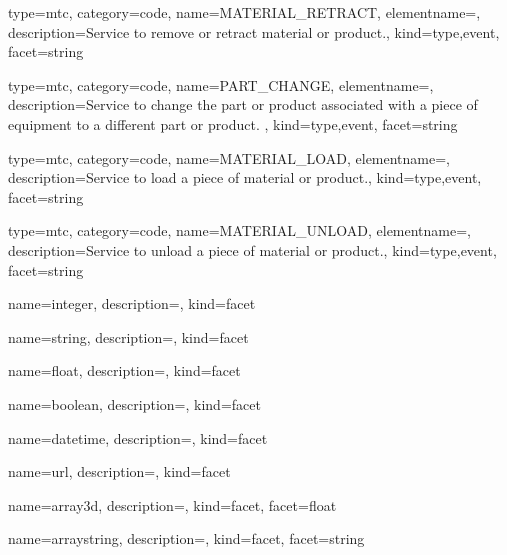 {
  type=mtc,
  category=code,
  name={MATERIAL\_RETRACT},
  elementname=,
  description={Service to remove or retract material or product.},
  kind={type,event},
  facet={\gls{string}}
}


{
  type=mtc,
  category=code,
  name={PART\_CHANGE},
  elementname=,
  description={Service to change the part or product associated with a piece of equipment to a different part or product.  },
  kind={type,event},
  facet={\gls{string}}
}


{
  type=mtc,
  category=code,
  name={MATERIAL\_LOAD},
  elementname=,
  description={Service to load a piece of material or product.},
  kind={type,event},
  facet={\gls{string}}
}


{
  type=mtc,
  category=code,
  name={MATERIAL\_UNLOAD},
  elementname=,
  description={Service to unload a piece of material or product.},
  kind={type,event},
  facet={\gls{string}}
}


{
  name={integer},
  description={},
  kind={facet}
}


{
  name={string},
  description={},
  kind={facet}
}


{
  name={float},
  description={},
  kind={facet}
}


{
  name={boolean},
  description={},
  kind={facet}
}


{
  name={datetime},
  description={},
  kind={facet}
}


{
  name={url},
  description={},
  kind={facet}
}


{
  name={array3d},
  description={},
  kind={facet},
  facet={\gls{float}}
}

{
  name={arraystring},
  description={},
  kind={facet},
  facet={\gls{string}}
}
